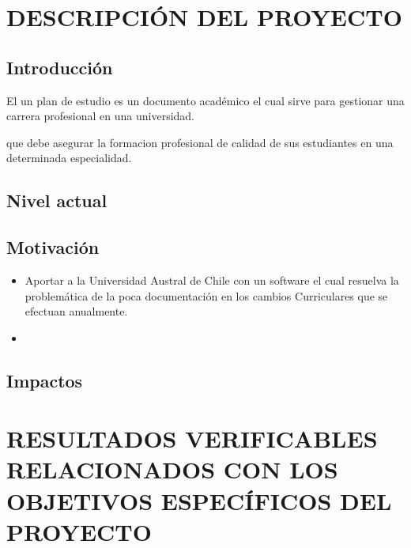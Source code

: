 \documentclass[12pt]{article}
\begin{document}
	\section{DESCRIPCIÓN DEL PROYECTO}
	
		\subsection{Introducción}
	  El un plan de estudio es un documento académico el cual sirve para  gestionar una carrera profesional en una universidad.
	  
	  que debe asegurar la formacion profesional 
de calidad de sus estudiantes en una determinada especialidad.
     	 \newpage
     	 
     	 
    

		\subsection{Nivel actual}
	
\newpage
		\subsection{Motivación}
		\begin{itemize}
		 \item Aportar a la Universidad Austral de Chile con un software el cual resuelva la problemática de la poca 
		 documentación en los cambios Curriculares que se efectuan anualmente.
		 \item 

		\end{itemize}

 
		\subsection{Impactos}

\section{RESULTADOS VERIFICABLES RELACIONADOS CON LOS  OBJETIVOS ESPECÍFICOS DEL \\ PROYECTO}
\end{document}
